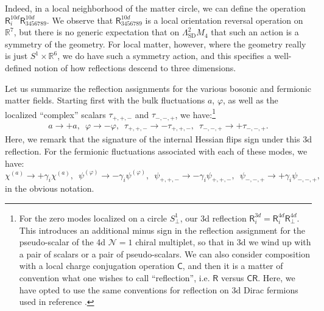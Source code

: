 \documentclass[12pt]{article}%
\numberwithin{equation}{section}
\renewcommand{\(}{\left(}
\renewcommand{\)}{\right)}
\renewcommand{\[}{\left[}
\renewcommand{\]}{\right]}
\begin{document}
Indeed, in a local neighborhood of the matter circle, we can define the operation $\mathsf{R}_{i}^{10d} \mathsf{R}^{10d}_{3456789}$. We observe that $\mathsf{R}^{10d}_{3456789}$ is a local orientation reversal operation on $\mathbb{R}^{7}$, but there is no generic expectation that on $\Lambda^{2}_{\mathrm{SD}} M_4$ that such an action is a symmetry of the geometry. For local matter, however, where the geometry really is just $S^1 \times \mathbb{R}^{6}$, we do have such a symmetry action, and this specifies a well-defined notion of how reflections descend to three dimensions.

Let us summarize the reflection assignments for the various bosonic and fermionic matter fields. Starting first
with the bulk fluctuations $a$, $\varphi$, as well as the localized ``complex'' scalars
$\tau_{+,+,-}$ and $\tau_{-,-,+}$, we have:\footnote{For the zero modes localized on a circle $S_{\bot}^{1}$,
our 3d reflection $\mathsf{R}_{i}^{3d} = \mathsf{R}_{i}^{4d} \mathsf{R}^{4d}_{\bot}$. This introduces an additional
minus sign in the reflection assignment for the pseudo-scalar of the 4d $\mathcal{N} = 1$ chiral multiplet, so that in 3d we wind up
with a pair of scalars or a pair of pseudo-scalars. We can also consider composition with a local charge conjugation operation $\mathsf{C}$,
and then it is a matter of convention what one wishes to call ``reflection'', i.e. $\mathsf{R}$ versus $\mathsf{CR}$.
Here, we have opted to use the same conventions for reflection on 3d Dirac fermions used in reference \cite{Witten:2015aba}.}
\begin{align}
a \rightarrow + a, \,\,\, \varphi \rightarrow - \varphi, \,\,\,
\tau_{+,+,-} \rightarrow - \tau_{+,+,-}, \,\,\, \tau_{-,-,+} \rightarrow + \tau_{-,-,+}.
\end{align}
Here, we remark that the signature of the internal Hessian flips sign under this 3d reflection.
For the fermionic fluctuations associated with each of these modes, we have:
\begin{equation}\label{eqn:finalreflections}
\chi^{(a)} \rightarrow +\gamma_{i} \chi^{(a)}, \,\,\, \psi^{(\varphi)} \rightarrow - \gamma_{i} \psi^{(\varphi)}, \,\,\,
\psi_{+,+,-} \rightarrow - \gamma_{i} \psi_{+,+,-}, \,\,\, \psi_{-,-,+} \rightarrow + \gamma_{i} \psi_{-,-,+},
\end{equation}
in the obvious notation.
\end{document}
